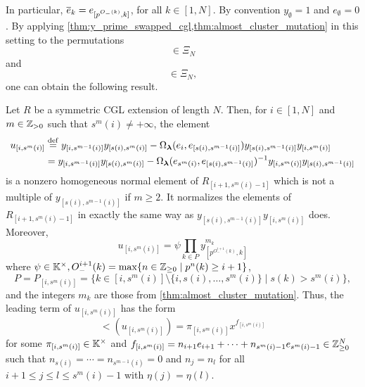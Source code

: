 In particular, $\overline{e}_k = e_{[p^{O_{-}(k)}, k]}$, for all $k \in [1, N]$. By convention
$y_{\emptyset} = 1$ and $e_{\emptyset} = 0$. By applying
\cref{thm:y_prime_swapped_cgl,thm:almost_cluster_mutation} in this setting to the
permutations
\begin{equation*}
	[i+1, i+2, \dotsc, s^m(i)-1,i,s^{m}(i), s^m(i)+1, \dotsc, N, i-1, \dotsc,1] \in \Xi_N
\end{equation*}
and
\begin{equation*}
	[i+1, i+2, \dotsc, s^m(i)-1,s^m(i),i,s^m(i)+1,\dotsc, N,i-1,\dotsc,1] \in \Xi_N,
\end{equation*}
one can obtain the following result.
\begin{proposition}\label{prop:def_u_brackets}

	Let $R$ be a symmetric CGL extension of length $N$. Then, for $i\in [1, N]$ and $m \in
		\mathbb{Z}_{> 0}$ such that $s^m(i) \neq + \infty$, the element
	\begin{align*}
		u_{[i, s^m(i)]} & \overset{\mathrm{def}}{=} y_{[i, s^{m-1}(i)]}y_{[s(i), s^m(i)]} - \Omega_{\boldsymbol{\lambda}}(e_i, e_{[s(i), s^{m-1}(i)]})y_{[s(i), s^{m-1}(i)]}y_{[i, s^m(i)]}        \\
		                & = y_{[i, s^{m-1}(i)]}y_{[s(i), s^m(i)]} - \Omega_{\boldsymbol{\lambda}}(e_{s^m(i)}, e_{[s(i), s^{m-1}(i)]})^{-1} y_{[i, s^m(i)]}y_{[s(i), s^{m-1}(i)]}
	\end{align*}
	is a nonzero homogeneous normal element of $R_{[i+1, s^m(i) - 1]}$ which is not a
	multiple of $y_{[s(i), s^{m-1}(i)]}$ if $m \geq 2$. It normalizes the elements of
	$R_{[i+1, s^m(i) - 1]}$ in exactly the same way as $y_{[s(i),
						s^{m-1}(i)]}y_{[i,s^m(i)]}$ does. Moreover,
	\begin{equation*}
		u_{[i, s^m(i)]} = \psi \prod_{k \in P} y^{m_k}_{[p^{O_{-}^{i+1}(k)}, k]}
	\end{equation*}
	where $\psi \in \mathbb{K}^\times, O^{i+1}_{-}(k) = \max\{n \in \mathbb{Z}_{\geq 0} \mid p^n(k) \geq i + 1\}$,
	\begin{equation*}
		P = P_{[i,s^m (i)]} = \{k \in [i, s^m(i)]\setminus \{i, s(i), \dots, s^m(i)\} \mid s(k) > s^m(i)\},
	\end{equation*}
	and the integers $m_k$ are those from \cref{thm:almost_cluster_mutation}. Thus, the
	leading term of $u_{[i, s^m(i)]}$ has the form
	\begin{equation*}
		\lt (u_{[i, s^m(i)]}) = \pi_{[i, s^m(i)]} x^{f_{[i, s^m(i)]}}
	\end{equation*}
	for some $\pi_{[i, s^m(i)]} \in \mathbb{K}^\times$ and $f_{[i, s^m(i)]} = n_{i+1}e_{i+1} +
		\cdots + n_{s^m(i) -1}e_{s^m(i)-1} \in \mathbb{Z}_{\geq 0}^N$ such that $n_{s(i)} = \cdots =
		n_{s^{m-1}(i)} = 0$ and $n_j = n_l$ for all $i+1 \leq j \leq l \leq s^m(i)-1$ with
	$\eta(j) = \eta(l)$.
\end{proposition}

